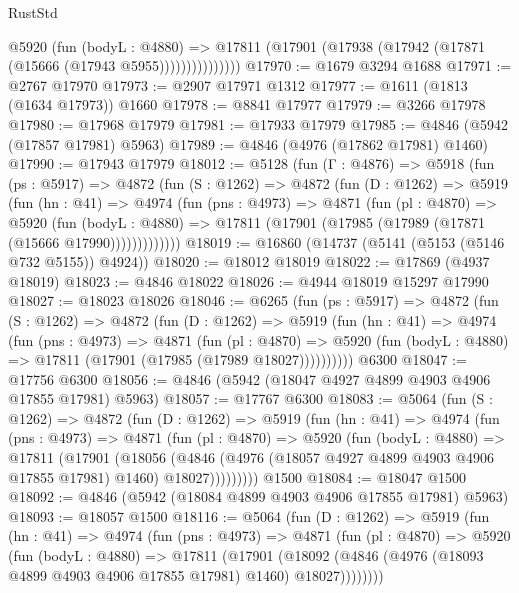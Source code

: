 \begin{lexlean}{RustStd}
\begin{coremodule}
                  @5920
                    (fun (bodyL : @4880) =>
                    @17811 (@17901 (@17938 (@17942 (@17871 (@15666 (@17943 @5955)))))))))))))))
@17970 := @1679 @3294 @1688
@17971 := @2767 @17970
@17973 := @2907 @17971 @1312
@17977 := @1611 (@1813 (@1634 @17973)) @1660
@17978 := @8841 @17977
@17979 := @3266 @17978
@17980 := @17968 @17979
@17981 := @17933 @17979
@17985 := @4846 (@5942 (@17857 @17981) @5963)
@17989 := @4846 (@4976 (@17862 @17981) @1460)
@17990 := @17943 @17979
@18012 := @5128
    (fun (Γ : @4876) =>
    @5918
      (fun (ps : @5917) =>
      @4872
        (fun (S : @1262) =>
        @4872
          (fun (D : @1262) =>
          @5919
            (fun (hn : @41) =>
            @4974
              (fun (pns : @4973) =>
              @4871
                (fun (pl : @4870) =>
                @5920
                  (fun (bodyL : @4880) =>
                  @17811 (@17901 (@17985 (@17989 (@17871 (@15666 @17990)))))))))))))
@18019 := @16860 (@14737 (@5141 (@5153 (@5146 @732 @5155)) @4924))
@18020 := @18012 @18019
@18022 := @17869 (@4937 @18019)
@18023 := @4846 @18022
@18026 := @4944 @18019 @15297 @17990
@18027 := @18023 @18026
@18046 := @6265
    (fun (ps : @5917) =>
    @4872
      (fun (S : @1262) =>
      @4872
        (fun (D : @1262) =>
        @5919
          (fun (hn : @41) =>
          @4974
            (fun (pns : @4973) =>
            @4871
              (fun (pl : @4870) =>
              @5920 (fun (bodyL : @4880) => @17811 (@17901 (@17985 (@17989 @18027))))))))))
    @6300
@18047 := @17756 @6300
@18056 := @4846 (@5942 (@18047 @4927 @4899 @4903 @4906 @17855 @17981) @5963)
@18057 := @17767 @6300
@18083 := @5064
    (fun (S : @1262) =>
    @4872
      (fun (D : @1262) =>
      @5919
        (fun (hn : @41) =>
        @4974
          (fun (pns : @4973) =>
          @4871
            (fun (pl : @4870) =>
            @5920
              (fun (bodyL : @4880) =>
              @17811
                (@17901
                  (@18056
                    (@4846
                      (@4976 (@18057 @4927 @4899 @4903 @4906 @17855 @17981) @1460)
                      @18027)))))))))
    @1500
@18084 := @18047 @1500
@18092 := @4846 (@5942 (@18084 @4899 @4903 @4906 @17855 @17981) @5963)
@18093 := @18057 @1500
@18116 := @5064
    (fun (D : @1262) =>
    @5919
      (fun (hn : @41) =>
      @4974
        (fun (pns : @4973) =>
        @4871
          (fun (pl : @4870) =>
          @5920
            (fun (bodyL : @4880) =>
            @17811
              (@17901
                (@18092 (@4846 (@4976 (@18093 @4899 @4903 @4906 @17855 @17981) @1460) @18027))))))))

\end{coremodule}
\end{lexlean}
